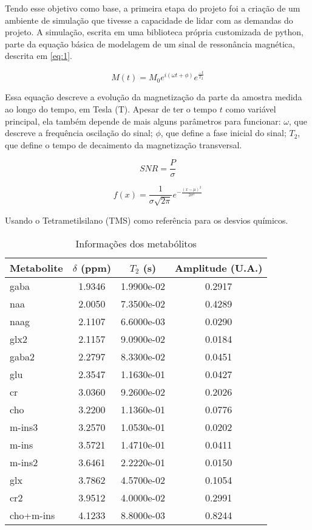 \documentclass{article}
\begin{document}
Tendo esse objetivo como base, a primeira etapa do projeto foi a criação de um ambiente de simulação
que tivesse a capacidade de lidar com as demandas do projeto. A simulação, escrita em uma biblioteca 
própria customizada de python, parte da equação básica de modelagem de um sinal de ressonância magnética, 
descrita em \ref{eq:1}.

\begin{equation} \label{eq:1}
    M(t) = M_0 e^{i(\omega t + \phi)} e^{\frac{-t}{T_2}}
\end{equation}

Essa equação descreve a evolução da magnetização da parte da amostra medida ao longo do tempo, em Tesla (T). 
Apesar de ter o tempo $t$ como variável principal, ela também depende de mais alguns parâmetros para 
funcionar: $\omega$, que descreve a frequência oscilação do sinal; $\phi$, que define a fase inicial do 
sinal; $T_2$, que define o tempo de decaimento da magnetização transversal. 

\begin{equation} \label{eq:2}
    SNR = \frac{P}{\sigma}
\end{equation}

\begin{equation} \label{eq:3}
    f(x) = \frac{1}{\sigma \sqrt{2\pi}}e^{-\frac{(x - \mu)^2}{2\sigma ^2}}
\end{equation}

Usando o Tetrametilsilano (TMS) como referência para os desvios químicos.


\begin{table}[H]
    \centering
    \begin{tabular}{|l|c|c|c|}
    \hline
    Metabolite & $\delta$ (ppm) & $T_2$ (s) & Amplitude (U.A.) \\
    \hline
    gaba & 1.9346 & 1.9900e-02 & 0.2917 \\
    naa & 2.0050 & 7.3500e-02 & 0.4289 \\
    naag & 2.1107 & 6.6000e-03 & 0.0290 \\
    glx2 & 2.1157 & 9.0900e-02 & 0.0184 \\
    gaba2 & 2.2797 & 8.3300e-02 & 0.0451 \\
    glu & 2.3547 & 1.1630e-01 & 0.0427 \\
    cr & 3.0360 & 9.2600e-02 & 0.2026 \\
    cho & 3.2200 & 1.1360e-01 & 0.0776 \\
    m-ins3 & 3.2570 & 1.0530e-01 & 0.0202 \\
    m-ins & 3.5721 & 1.4710e-01 & 0.0411 \\
    m-ins2 & 3.6461 & 2.2220e-01 & 0.0150 \\
    glx & 3.7862 & 4.5700e-02 & 0.1054 \\
    cr2 & 3.9512 & 4.0000e-02 & 0.2991 \\
    cho+m-ins & 4.1233 & 8.8000e-03 & 0.8244 \\
    \hline
    \end{tabular}
    \caption{Informações dos metabólitos}
\end{table}
\end{document}
